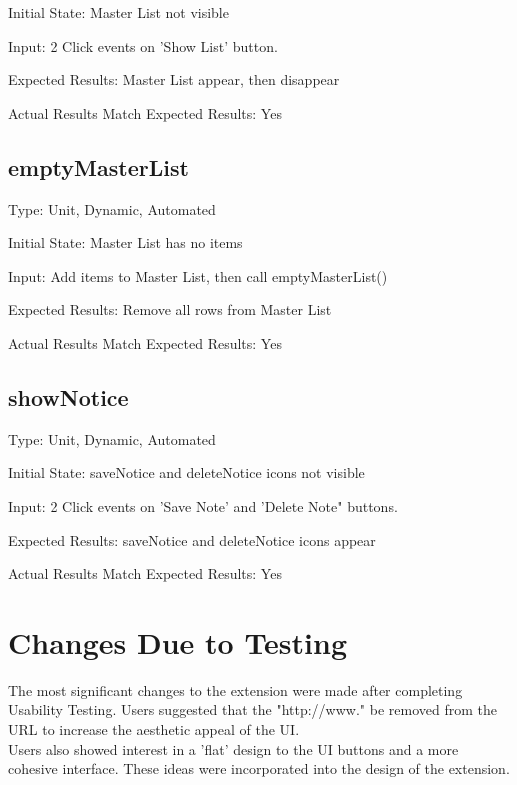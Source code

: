 \documentclass[12pt, titlepage]{article}
\begin{document}
	Initial State: Master List not visible

	Input: 2 Click events on 'Show List' button.

	Expected Results: Master List appear, then disappear

	Actual Results Match Expected Results: Yes

\subsection{emptyMasterList}

	Type: Unit, Dynamic, Automated

	Initial State: Master List has no items

	Input: Add items to Master List, then call emptyMasterList()

	Expected Results: Remove all rows from Master List 

	Actual Results Match Expected Results: Yes

\subsection{showNotice}

	Type: Unit, Dynamic, Automated

	Initial State: saveNotice and deleteNotice icons not visible

	Input: 2 Click events on 'Save Note' and 'Delete Note" buttons.

	Expected Results: saveNotice and deleteNotice icons appear

	Actual Results Match Expected Results: Yes

\section{Changes Due to Testing}
		
	The most significant changes to the extension were made after completing 
	Usability Testing. Users suggested that the "http://www." be removed from 
	the URL to increase the aesthetic appeal of the UI.\\
	Users also showed interest in a 'flat' design to the UI buttons and a more 
	cohesive interface. These ideas were incorporated into the design of the 
	extension.
		
\end{document}
